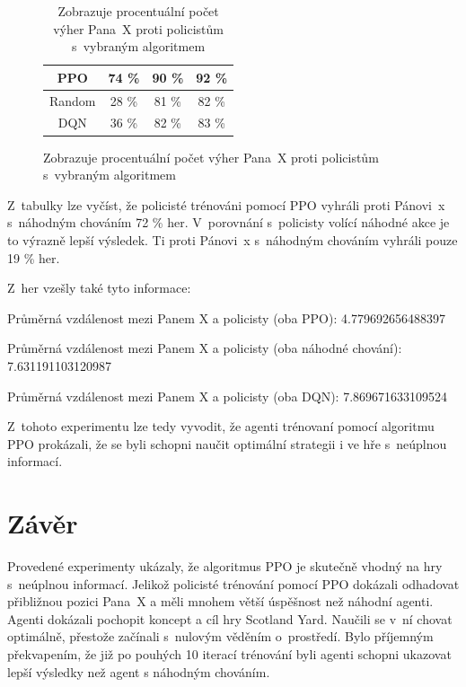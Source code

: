 \begin{figure}[H]
\begin{minipage}{.48\textwidth}
\begin{table}[H]
\begin{tabular}{@{} c|c|c|c @{}}
      \hline
      PPO                                    & 74 \% & 90 \% & 92 \% \\ \hline
      Random                                    & 28 \% & 81 \% & 82 \% \\ \hline
      DQN                                    & 36 \% & 82 \% & 83 \% \\ \hline
      \end{tabular}
      \caption{Zobrazuje procentuální počet výher Pana~X proti policistům s~vybraným algoritmem}
      \label{tab:train_experiment_mrx_wins}
    \end{table}
  \end{minipage}
  \end{figure}

Z~tabulky lze vyčíst, že policisté trénováni pomocí PPO vyhráli proti Pánovi~x s~náhodným chováním 72 \% her.
V~porovnání s~policisty volící náhodné akce je to výrazně lepší výsledek.
Ti proti Pánovi~x s~náhodným chováním vyhráli pouze 19 \% her.

Z~her vzešly také tyto informace:
\begin{myitemize}
  \item Průměrná vzdálenost mezi Panem X a policisty (oba PPO): 4.779692656488397
  \item Průměrná vzdálenost mezi Panem X a policisty (oba náhodné chování): 7.631191103120987
  \item Průměrná vzdálenost mezi Panem X a policisty (oba DQN): 7.869671633109524
\end{myitemize}

Z~tohoto experimentu lze tedy vyvodit, že agenti trénovaní pomocí algoritmu PPO prokázali, že se byli schopni naučit optimální strategii i ve hře s~neúplnou informací.

\chapter{Závěr}
\label{ch:zaver}

Provedené experimenty ukázaly, že algoritmus PPO je skutečně vhodný na hry s~neúplnou informací.
Jelikož policisté trénování pomocí PPO dokázali odhadovat přibližnou pozici Pana~X a měli mnohem větší úspěšnost než náhodní agenti.
Agenti dokázali pochopit koncept a cíl hry Scotland Yard.
Naučili se v~ní chovat optimálně, přestože začínali s~nulovým věděním o~prostředí.
Bylo příjemným překvapením, že již po pouhých 10 iterací trénování byli agenti schopni ukazovat lepší výsledky než agent s náhodným chováním.

